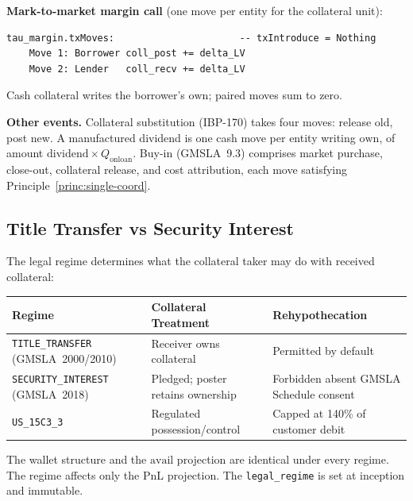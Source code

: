 \noindent\textbf{Mark-to-market margin call} (one move per entity for the collateral unit):
\begin{lstlisting}
tau_margin.txMoves:                      -- txIntroduce = Nothing
    Move 1: Borrower coll_post += delta_LV
    Move 2: Lender   coll_recv += delta_LV
\end{lstlisting}
Cash collateral writes the borrower's $\mathrm{own}$; paired moves sum to zero.

\noindent\textbf{Other events.} Collateral substitution (IBP-170) takes four moves: release old, post new. A manufactured dividend is one cash move per entity writing $\mathrm{own}$, of amount $\text{dividend}\times Q_{\mathrm{onloan}}$. Buy-in (GMSLA~9.3) comprises market purchase, close-out, collateral release, and cost attribution, each move satisfying Principle~\ref{princ:single-coord}.

\subsection{Title Transfer vs Security Interest}
\label{sec:sbl-title-transfer}

The legal regime determines what the collateral taker may do with received collateral:

\begin{center}
\small
\begin{tabular}{l p{4.2cm} p{4.2cm}}
\toprule
\textbf{Regime} & \textbf{Collateral Treatment} & \textbf{Rehypothecation} \\
\midrule
\texttt{TITLE\_TRANSFER} (GMSLA~2000/2010) & Receiver owns collateral & Permitted by default \\
\texttt{SECURITY\_INTEREST} (GMSLA~2018) & Pledged; poster retains ownership & Forbidden absent GMSLA Schedule consent \\
\texttt{US\_15C3\_3} & Regulated possession/control & Capped at 140\% of customer debit \\
\bottomrule
\end{tabular}
\end{center}

The wallet structure and the $\mathrm{avail}$ projection are identical under every regime. The regime affects only the PnL projection. The \texttt{legal\_regime} is set at inception and immutable.

